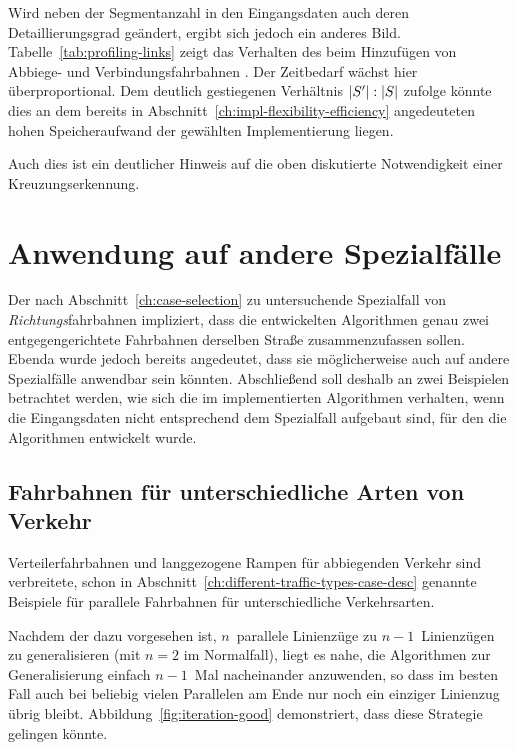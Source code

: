 \documentclass[../main/thesis.tex]{subfiles}
\begin{document}
Wird neben der Segmentanzahl in den Eingangsdaten auch deren Detaillierungsgrad geändert, ergibt sich jedoch ein anderes Bild.
Tabelle~\ref{tab:profiling-links} zeigt das Verhalten des  beim Hinzufügen von Abbiege- und Verbindungsfahrbahnen .
Der Zeitbedarf wächst hier überproportional.
Dem deutlich gestiegenen Verhältnis $|S'|\nobreak:\nobreak|S|$ zufolge könnte dies an dem bereits in Abschnitt~\ref{ch:impl-flexibility-efficiency} angedeuteten hohen Speicheraufwand der gewählten Implementierung liegen.

Auch dies ist ein deutlicher Hinweis auf die oben diskutierte Notwendigkeit einer Kreuzungserkennung.




\section{Anwendung auf andere Spezialfälle}
\label{ch:result-other-cases}

Der nach Abschnitt~\ref{ch:case-selection} zu untersuchende Spezialfall von \emph{Richtungs}fahrbahnen impliziert, dass die entwickelten Algorithmen genau zwei entgegengerichtete Fahrbahnen derselben Straße zusammenzufassen sollen.
Ebenda wurde jedoch bereits angedeutet, dass sie möglicherweise auch auf andere Spezialfälle anwendbar sein könnten.
Abschließend soll deshalb an zwei Beispielen betrachtet werden, wie sich die im  implementierten Algorithmen verhalten, wenn die Eingangsdaten nicht entsprechend dem Spezialfall aufgebaut sind, für den die Algorithmen entwickelt wurde.



\subsection{Fahrbahnen für unterschiedliche Arten von Verkehr}

Verteilerfahrbahnen und langgezogene Rampen für abbiegenden Verkehr sind verbreitete, schon in Abschnitt~\ref{ch:different-traffic-types-case-desc} genannte Beispiele für parallele Fahrbahnen für unterschiedliche Verkehrsarten.

Nachdem der  dazu vorgesehen ist, $n$~parallele Linienzüge zu $n-1$~Linienzügen zu generalisieren (mit $n=2$ im Normalfall), liegt es nahe, die Algorithmen zur Generalisierung einfach $n-1$~Mal nacheinander anzuwenden, so dass im besten Fall auch bei beliebig vielen Parallelen am Ende nur noch ein einziger Linienzug übrig bleibt.
Abbildung~\ref{fig:iteration-good} demonstriert, dass diese Strategie gelingen könnte.
\end{document}
